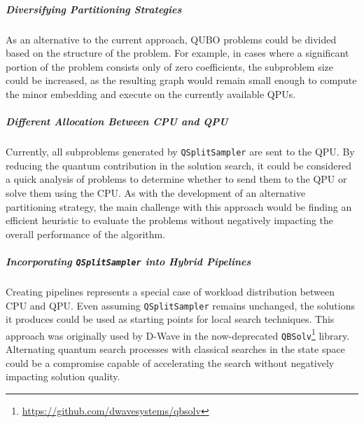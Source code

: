 \subparagraph{Diversifying Partitioning Strategies} As an alternative to the current approach, QUBO problems could be divided based on the structure of the problem. For example, in cases where a significant portion of the problem consists only of zero coefficients, the subproblem size could be increased, as the resulting graph would remain small enough to compute the minor embedding and execute on the currently available QPUs.

\subparagraph{Different Allocation Between CPU and QPU} Currently, all subproblems generated by \texttt{QSplitSampler} are sent to the QPU. By reducing the quantum contribution in the solution search, it could be considered a quick analysis of problems to determine whether to send them to the QPU or solve them using the CPU. As with the development of an alternative partitioning strategy, the main challenge with this approach would be finding an efficient heuristic to evaluate the problems without negatively impacting the overall performance of the algorithm.

\subparagraph{Incorporating \texttt{QSplitSampler} into Hybrid Pipelines} Creating pipelines represents a special case of workload distribution between CPU and QPU. Even assuming \texttt{QSplitSampler} remains unchanged, the solutions it produces could be used as starting points for local search techniques. This approach was originally used by D-Wave in the now-deprecated \texttt{QBSolv}\footnote{\url{https://github.com/dwavesystems/qbsolv}} library. Alternating quantum search processes with classical searches in the state space could be a compromise capable of accelerating the search without negatively impacting solution quality.
